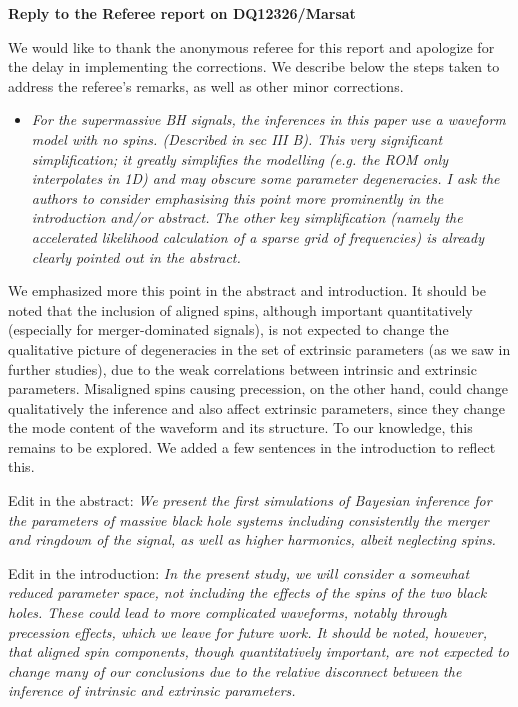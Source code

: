 \documentclass[11pt]{letter}
\begin{document}
\textbf{Reply to the Referee report on DQ12326/Marsat}

We would like to thank the anonymous referee for this report and apologize for the delay in implementing the corrections. We describe below the steps taken to address the referee's remarks, as well as other minor corrections.

\begin{itemize}
	\item {\it For the supermassive BH signals, the inferences in this
paper use a waveform model with no spins. (Described in
sec III B). This very significant simplification; it greatly
simplifies the modelling (e.g. the ROM only interpolates in 1D)
and may obscure some parameter degeneracies. I ask the authors
to consider emphasising this point more prominently in the
introduction and/or abstract. The other key simplification
(namely the accelerated likelihood calculation of a sparse grid
of frequencies) is already clearly pointed out in the abstract.}
\end{itemize}

We emphasized more this point in the abstract and introduction. It should be noted that the inclusion of aligned spins, although important quantitatively (especially for merger-dominated signals), is not expected to change the qualitative picture of degeneracies in the set of extrinsic parameters (as we saw in further studies), due to the weak correlations between intrinsic and extrinsic parameters. Misaligned spins causing precession, on the other hand, could change qualitatively the inference and also affect extrinsic parameters, since they change the mode content of the waveform and its structure. To our knowledge, this remains to be explored. We added a few sentences in the introduction to reflect this.

Edit in the abstract: {\it We present the first simulations of Bayesian inference for the parameters of massive black hole systems including consistently the merger and ringdown of the signal, as well as higher harmonics, albeit neglecting spins.}

Edit in the introduction: {\it In the present study, we will consider a somewhat reduced parameter space, not including the effects of the spins of the two black holes. These could lead to more complicated waveforms, notably through precession effects, which we leave for future work. It should be noted, however, that aligned spin components, though quantitatively important, are not expected to change many of our conclusions due to the relative disconnect between the inference of intrinsic and extrinsic parameters.}
\end{document}
